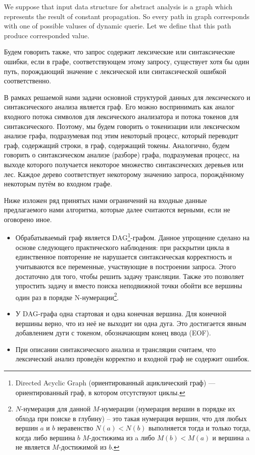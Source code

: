 \documentclass{llncs}
\begin{document}
We suppose that input data structure for abstract analysis is a graph which represents the result of constant propagation.  So every path in graph corresponds with one of possible valuses of dynamic querie. Let we define that this path produce corresponded value.

Будем говорить также, что запрос содержит лексические или синтаксические ошибки, если в графе, соответствующем этому запросу, существует хотя бы один путь, порождающий значение с лексической или синтаксической ошибкой соответственно.

В рамках решаемой нами задачи основной структурой данных для лексического и синтаксического анализа является граф. Его можно воспринимать как аналог входного потока символов для лексического анализатора и потока токенов для синтаксического. Поэтому, мы будем говорить о токенизации или лексическом анализе графа, подразумевая под этим некоторый процесс, который переводит граф, содержащий строки, в граф, содержащий токены. Аналогично, будем говорить о синтаксическом анализе (разборе) графа, подразумевая процесс, на выходе которого получается некоторое множество синтаксических деревьев или лес. Каждое дерево соответствует некоторому значению запроса, порождённому некоторым путём во входном графе.

	Ниже изложен ряд принятых нами ограничений на входные данные предлагаемого нами алгоритма, которые далее считаются верными, если не оговорено иное.
	\begin{itemize}
        \item Обрабатываемый граф является DAG\footnote{Directed Acyclic Graph (ориентированный ациклический граф) —  ориентированный граф, в котором отсутствуют циклы.}-графом. Данное упрощение сделано на основе следующего практического наблюдения: при раскрытии цикла в единственное повторение не нарушается синтаксическая корректность и учитываются все переменные, участвующие в построении запроса. Этого достаточно для того, чтобы решить задачу трансляции. Также это  позволяет упростить задачу и вместо поиска неподвижной точки обойти все вершины один раз в порядке N-нумерации\footnote{$N$-нумерация для данной $M$-нумерации (нумерация вершин в порядке их обхода при поиске в глубину) -- это такая нумерация  вершин, что для любых вершин  $a$ и $b$ неравенство $N(a)<N(b)$ выполняется тогда и только тогда, когда либо вершина $b$ $M$-достижима из a либо $M(b)<M(a)$  и вершина a не является $M$-достижимой из $b$. }.
        \item У DAG-графа одна стартовая и одна конечная вершина. Для конечной вершины верно, что из неё не выходит ни одна дуга. Это достигается явным добавлением дуги с токеном, обозначающим конец ввода (EOF).
        \item При описании синтаксического анализа и трансляции считаем, что лексический анализ проведён корректно и входной граф не содержит ошибок.
    \end{itemize}
\end{document}
